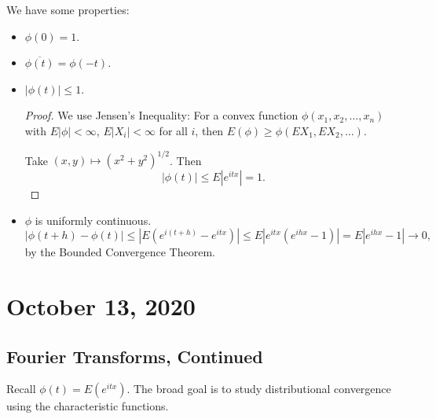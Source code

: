 \documentclass[11pt]{scrartcl}
\begin{document}
We have some properties:
\begin{itemize}
\item $\phi(0) = 1$.
\item $\overline{\phi(t)} = \phi(-t)$.
\item $|\phi(t) | \le 1$.  
\begin{proof}
We use Jensen's Inequality: For a convex function $\phi(x_1, x_2, \dots, x_n)$ with $E|\phi| < \infty$, $E|X_i| < \infty$ for all $i$, then $E(\phi) \ge \phi(EX_1, EX_2, \dots)$.

Take $(x, y) \mapsto (x^2 + y^2)^{1/2}$.  Then 
$$|\phi(t)| \le E|e^{itx}| = 1.$$
\end{proof}
\item $\phi$ is uniformly continuous.  $$|\phi(t+h) - \phi(t)| \le |E(e^{i(t+h)} - e^{itx})| \le  E|e^{itx}(e^{ihx}-1)| =  E|e^{ihx} - 1| \rightarrow 0,$$
by the Bounded Convergence Theorem.
\end{itemize}
\pagebreak
\section{October 13, 2020}
\subsection{Fourier Transforms, Continued}
Recall $\phi(t) = E(e^{itx})$.  The broad goal is to study distributional convergence using the characteristic functions.  
\end{document}

